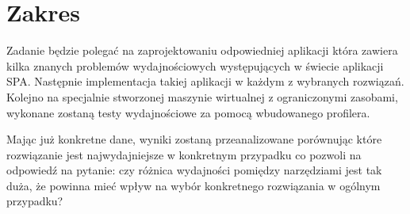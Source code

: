 \section{Zakres}

Zadanie będzie polegać na zaprojektowaniu odpowiedniej aplikacji która zawiera kilka znanych problemów wydajnościowych występujących w świecie aplikacji SPA. Następnie implementacja takiej aplikacji w każdym z wybranych rozwiązań. Kolejno na specjalnie stworzonej maszynie wirtualnej z ograniczonymi zasobami, wykonane zostaną testy wydajnościowe za pomocą wbudowanego profilera. 

Mając już konkretne dane, wyniki zostaną przeanalizowane porównując które rozwiązanie jest najwydajniejsze w konkretnym przypadku co pozwoli na odpowiedź na pytanie: czy różnica wydajności pomiędzy narzędziami jest tak duża, że powinna mieć wpływ na wybór konkretnego rozwiązania w ogólnym przypadku?
